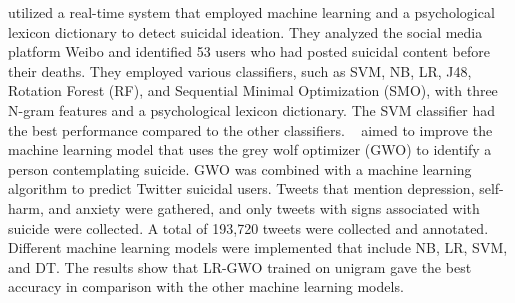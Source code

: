 \documentclass[sn-mathphys,Numbered]{sn-jnl}%
\begin{document}
\citet{17huang2014detecting} utilized a real-time system that employed machine learning and a psychological lexicon dictionary to detect suicidal ideation. They analyzed the social media platform Weibo and identified 53 users who had posted suicidal content before their deaths. They employed various classifiers, such as SVM, NB, LR, J48, Rotation Forest (RF), and Sequential Minimal Optimization (SMO), with three N-gram features and a psychological lexicon dictionary. The SVM classifier had the best performance compared to the other classifiers.%
~\citet{9678419} aimed to improve the machine learning model that uses the grey wolf optimizer (GWO) to identify a person contemplating suicide. GWO was combined with a machine learning algorithm to predict Twitter suicidal users. Tweets that mention depression, self-harm, and anxiety were gathered, and only tweets with signs associated with suicide were collected. A total of 193,720 tweets were collected and annotated. Different machine learning models were implemented that include NB, LR, SVM, and DT. The results show that LR-GWO trained on unigram gave the best accuracy in comparison with the other machine learning models.


\end{document}
